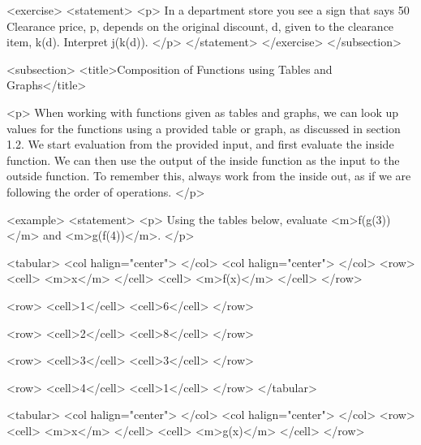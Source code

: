         <exercise>
            <statement>
                <p>
                    In a department store you see a sign that says 50%
                    Clearance price, p, depends on the original discount, d, given to the clearance item, k(d).
                    Interpret j(k(d)).
                </p>
            </statement>
        </exercise>
    </subsection>


    <subsection>
        <title>Composition of Functions using Tables and Graphs</title>

        <p>
            When working with functions given as tables and graphs, we can look up values for the functions using a provided table or graph, as discussed in section 1.2.
            We start evaluation from the provided input, and first evaluate the inside function.
            We can then use the output of the inside function as the input to the outside function.
            To remember this, always work from the inside out, as if we are following the order of operations.
        </p>

        <example>
            <statement>
                <p>
                    Using the tables below, evaluate <m>f(g(3))</m> and <m>g(f(4))</m>.
                </p>

                <tabular>
                    <col halign="center"> </col> <col halign="center"> </col>
                    <row>
                        <cell> <m>x</m> </cell>
                        <cell> <m>f(x)</m> </cell>
                    </row>

                    <row>
                        <cell>1</cell>
                        <cell>6</cell>
                    </row>

                    <row>
                        <cell>2</cell>
                        <cell>8</cell>
                    </row>

                    <row>
                        <cell>3</cell>
                        <cell>3</cell>
                    </row>

                    <row>
                        <cell>4</cell>
                        <cell>1</cell>
                    </row>
                </tabular>

                <tabular>
                    <col halign="center"> </col> <col halign="center"> </col>
                    <row>
                        <cell> <m>x</m> </cell>
                        <cell> <m>g(x)</m> </cell>
                    </row>

